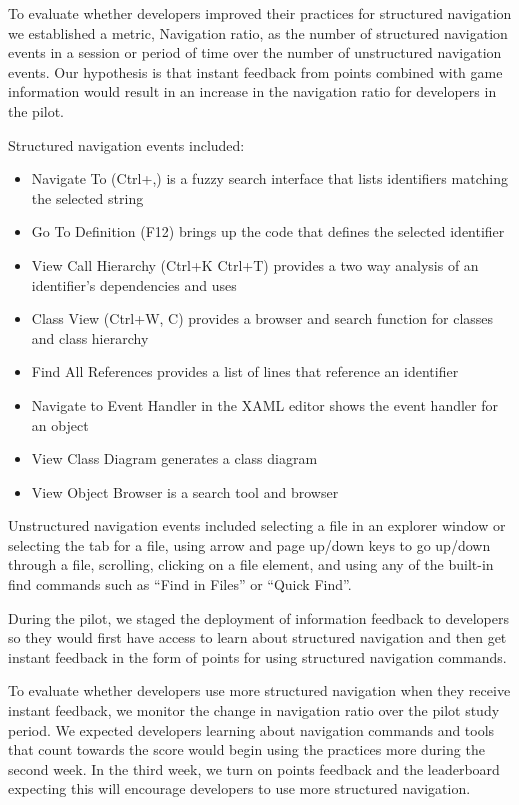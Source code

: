 \documentclass{sig-alternate}
\begin{document}
To evaluate whether developers improved their practices for structured navigation we established a metric, Navigation ratio, as the number of structured navigation events in a session or period of time over the number of unstructured navigation events.  Our hypothesis is that instant feedback from points combined with game information would result in an increase in the navigation ratio for developers in the pilot.

Structured navigation events included: 
\begin{itemize}[itemsep=0mm]
\item Navigate To (Ctrl+,) is a fuzzy search interface that lists identifiers matching the selected string 
\item Go To Definition (F12) brings up the code that defines the selected identifier 
\item View Call Hierarchy (Ctrl+K Ctrl+T) provides a two way analysis of an identifier's dependencies and uses
\item Class View (Ctrl+W, C) provides a browser and search function for classes and class hierarchy
\item Find All References provides a list of lines that reference an identifier
\item Navigate to Event Handler in the XAML editor shows the event handler for an object
\item View Class Diagram generates a class diagram 
\item View Object Browser is a search tool and browser
\end{itemize}

Unstructured navigation events included selecting a file in an explorer window or selecting the tab for a file, using arrow and page up/down keys to go up/down through a file, scrolling, clicking on a file element, and using any of the built-in find commands such as ``Find in Files'' or ``Quick Find''.

During the pilot, we staged the deployment of information feedback to developers so they would first have access to learn about structured navigation and then get instant feedback in the form of points for using structured navigation commands.  

To evaluate whether developers use more structured navigation when they receive instant feedback, we monitor the change in navigation ratio over the pilot study period.   We expected developers learning about navigation commands and tools that count towards the score would begin using the practices more during the second week.  In the third week, we turn on points feedback and the leaderboard expecting this will encourage developers to use more structured navigation.  
\end{document}
